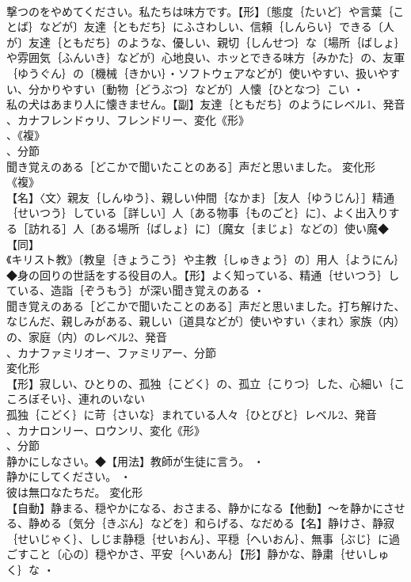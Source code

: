\documentclass[8pt]{extreport}
\begin{document}
\begin{CJK}{UTF8}{min}
\\	撃つのをやめてください。私たちは味方です。【形】〔態度｛たいど｝や言葉｛ことば｝などが〕友達｛ともだち｝にふさわしい、信頼｛しんらい｝できる〔人が〕友達｛ともだち｝のような、優しい、親切｛しんせつ｝な〔場所｛ばしょ｝や雰囲気｛ふんいき｝などが〕心地良い、ホッとできる味方｛みかた｝の、友軍｛ゆうぐん｝の〔機械｛きかい｝・ソフトウェアなどが〕使いやすい、扱いやすい、分かりやすい〔動物｛どうぶつ｝などが〕人懐｛ひとなつ｝こい ・
\\	私の犬はあまり人に懐きません。【副】友達｛ともだち｝のようにレベル1、発音
\\	、カナフレンドゥリ、フレンドリー、変化《形》
\\	、《複》
\\	、分節
\\	聞き覚えのある［どこかで聞いたことのある］声だと思いました。	変化形 
\\	《複》
\\	【名】〈文〉親友｛しんゆう｝、親しい仲間｛なかま｝［友人｛ゆうじん｝］精通｛せいつう｝している［詳しい］人〔ある物事｛ものごと｝に〕、よく出入りする［訪れる］人〔ある場所｛ばしょ｝に〕〔魔女｛まじょ｝などの〕使い魔◆【同】
\\	《キリスト教》〔教皇｛きょうこう｝や主教｛しゅきょう｝の〕用人｛ようにん｝◆身の回りの世話をする役目の人。【形】よく知っている、精通｛せいつう｝している、造詣｛ぞうもう｝が深い聞き覚えのある ・
\\	聞き覚えのある［どこかで聞いたことのある］声だと思いました。打ち解けた、なじんだ、親しみがある、親しい〔道具などが〕使いやすい〈まれ〉家族（内）の、家庭（内）のレベル2、発音
\\	、カナファミリオー、ファミリアー、分節
\\	変化形 
\\	【形】寂しい、ひとりの、孤独｛こどく｝の、孤立｛こりつ｝した、心細い｛こころぼそい｝、連れのいない
\\	孤独｛こどく｝に苛｛さいな｝まれている人々｛ひとびと｝レベル2、発音
\\	、カナロンリー、ロウンリ、変化《形》
\\	、分節
\\	静かにしなさい。◆【用法】教師が生徒に言う。 ・
\\	静かにしてください。 ・
\\	彼は無口なたちだ。	変化形 
\\	【自動】静まる、穏やかになる、おさまる、静かになる【他動】～を静かにさせる、静める〔気分｛きぶん｝などを〕和らげる、なだめる【名】静けさ、静寂｛せいじゃく｝、しじま静穏｛せいおん｝、平穏｛へいおん｝、無事｛ぶじ｝に過ごすこと〔心の〕穏やかさ、平安｛へいあん｝【形】静かな、静粛｛せいしゅく｝な ・

\end{CJK}
\end{document}
